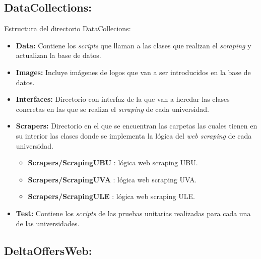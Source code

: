 \subsection{DataCollections:}

Estructura del directorio DataCollecions:
\begin{itemize}
    \item \textbf{Data:} Contiene los \textit{scripts} que llaman a las clases que realizan el \textit{scraping} y actualizan la base de datos.
    \item \textbf{Images:} Incluye imágenes de logos que van a ser introducidos en la base de datos.
    \item \textbf{Interfaces:} Directorio con interfaz de la que van a heredar las clases concretas en las que se realiza el \textit{scraping} de cada universidad.
    \item \textbf{Scrapers:} Directorio en el que se encuentran las carpetas las cuales tienen en su interior las clases donde se implementa la lógica del \textit{web scraping} de cada universidad.
    \begin{itemize}
        \item \textbf{Scrapers/ScrapingUBU} : lógica web scraping UBU.
        \item \textbf{Scrapers/ScrapingUVA} : lógica web scraping UVA.
        \item \textbf{Scrapers/ScrapingULE} : lógica web scraping ULE.
    \end{itemize}
    \item \textbf{Test:} Contiene los \textit{scripts} de las pruebas unitarias realizadas para cada una de las universidades.
\end{itemize}

\subsection{DeltaOffersWeb:}

